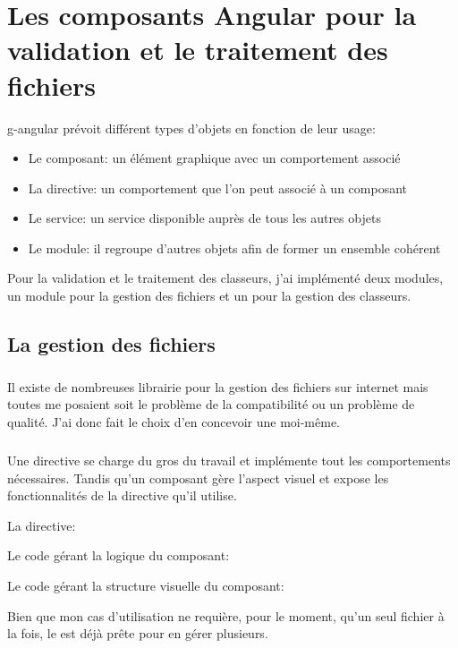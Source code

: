 \chapter{Les composants Angular pour la validation et le traitement des fichiers}
\label{ch:angular-components}

\Gls{g-angular} prévoit différent types d'objets en fonction de leur usage:
\begin{itemize}
    \item Le composant: un élément graphique avec un comportement associé
    \item La directive: un comportement que l'on peut associé à un composant
    \item Le service: un service disponible auprès de tous les autres objets
    \item Le module: il regroupe d'autres objets afin de former un ensemble cohérent
\end{itemize}

Pour la validation et le traitement des classeurs, j'ai implémenté deux modules, un module pour la gestion des fichiers et un pour la gestion des classeurs.

\section{La gestion des fichiers}
\label{sec:file-management}

\paragraph{}
Il existe de nombreuses librairie pour la gestion des fichiers sur internet mais toutes me posaient soit le problème de la compatibilité ou un problème de qualité.
J'ai donc fait le choix d'en concevoir une moi-même.

\paragraph{}
Une directive se charge du gros du travail et implémente tout les comportements nécessaires.
Tandis qu'un composant gère l'aspect visuel et expose les fonctionnalités de la directive qu'il utilise.

La directive:


Le code gérant la logique du composant:


Le code gérant la structure visuelle du composant:

Bien que mon cas d'utilisation ne requière, pour le moment, qu'un seul fichier à la fois, le est déjà prête pour en gérer plusieurs.
